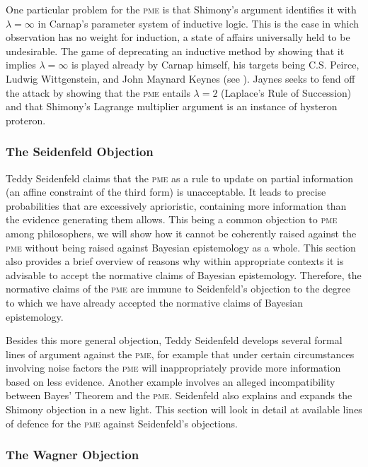 \documentclass[11pt]{article}
\begin{document}
One particular problem for the \textsc{pme} is that Shimony's argument
identifies it with $\lambda=\infty$ in Carnap's parameter system of
inductive logic. This is the case in which observation has no weight
for induction, a state of affairs universally held to be undesirable.
The game of deprecating an inductive method by showing that it implies
$\lambda=\infty$ is played already by Carnap himself, his targets
being C.S. Peirce, Ludwig Wittgenstein, and John Maynard Keynes (see
). Jaynes seeks to fend off the attack by
showing that the \textsc{pme} entails $\lambda=2$ (Laplace's Rule of
Succession) and that Shimony's Lagrange multiplier argument is an
instance of hysteron proteron.

\subsubsection{The Seidenfeld Objection}
\label{TheSeidenfeldObjection}

Teddy Seidenfeld claims that the \textsc{pme} as a rule to update on
partial information (an affine constraint of the third form) is
unacceptable. It leads to precise probabilities that are excessively
aprioristic, containing more information than the evidence generating
them allows. This being a common objection to \textsc{pme} among
philosophers, we will show how it cannot be coherently raised against
the \textsc{pme} without being raised against Bayesian epistemology as
a whole. This section also provides a brief overview of reasons why within
appropriate contexts it is advisable to accept the normative claims of
Bayesian epistemology. Therefore, the normative claims of the
\textsc{pme} are immune to Seidenfeld's objection to the degree to
which we have already accepted the normative claims of Bayesian
epistemology.

Besides this more general objection, Teddy Seidenfeld develops several
formal lines of argument against the \textsc{pme}, for example that
under certain circumstances involving noise factors the \textsc{pme}
will inappropriately provide more information based on less evidence.
Another example involves an alleged incompatibility between Bayes'
Theorem and the \textsc{pme}. Seidenfeld also explains and expands the
Shimony objection in a new light. This section will look in detail at
available lines of defence for the \textsc{pme} against Seidenfeld's
objections.

\subsubsection{The Wagner Objection}
\label{TheWagnerObjection}
\end{document}
